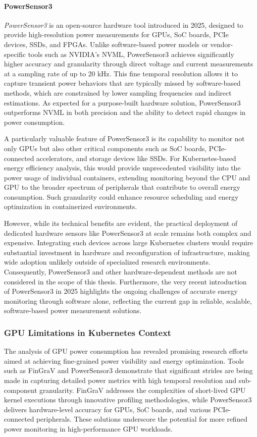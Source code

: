 \paragraph{PowerSensor3}
\textit{PowerSensor3}\parencite{van2025powersensor3} is an open-source hardware tool introduced in 2025, designed to provide high-resolution power measurements for GPUs, SoC boards, PCIe devices, SSDs, and FPGAs. Unlike software-based power models or vendor-specific tools such as NVIDIA's NVML, PowerSensor3 achieves significantly higher accuracy and granularity through direct voltage and current measurements at a sampling rate of up to 20 kHz. This fine temporal resolution allows it to capture transient power behaviors that are typically missed by software-based methods, which are constrained by lower sampling frequencies and indirect estimations. As expected for a purpose-built hardware solution, PowerSensor3 outperforms NVML in both precision and the ability to detect rapid changes in power consumption.

A particularly valuable feature of PowerSensor3 is its capability to monitor not only GPUs but also other critical components such as SoC boards, PCIe-connected accelerators, and storage devices like SSDs. For Kubernetes-based energy efficiency analysis, this would provide unprecedented visibility into the power usage of individual containers, extending monitoring beyond the CPU and GPU to the broader spectrum of peripherals that contribute to overall energy consumption. Such granularity could enhance resource scheduling and energy optimization in containerized environments.

However, while its technical benefits are evident, the practical deployment of dedicated hardware sensors like PowerSensor3 at scale remains both complex and expensive. Integrating such devices across large Kubernetes clusters would require substantial investment in hardware and reconfiguration of infrastructure, making wide adoption unlikely outside of specialized research environments. Consequently, PowerSensor3 and other hardware-dependent methods are not considered in the scope of this thesis. Furthermore, the very recent introduction of PowerSensor3 in 2025 highlights the ongoing challenges of accurate energy monitoring through software alone, reflecting the current gap in reliable, scalable, software-based power measurement solutions.

\subsubsection{GPU Limitations in Kubernetes Context}
The analysis of GPU power consumption has revealed promising research efforts aimed at achieving fine-grained power visibility and energy optimization. Tools such as FinGraV and PowerSensor3 demonstrate that significant strides are being made in capturing detailed power metrics with high temporal resolution and sub-component granularity. FinGraV addresses the complexities of short-lived GPU kernel executions through innovative profiling methodologies, while PowerSensor3 delivers hardware-level accuracy for GPUs, SoC boards, and various PCIe-connected peripherals. These solutions underscore the potential for more refined power monitoring in high-performance GPU workloads.

